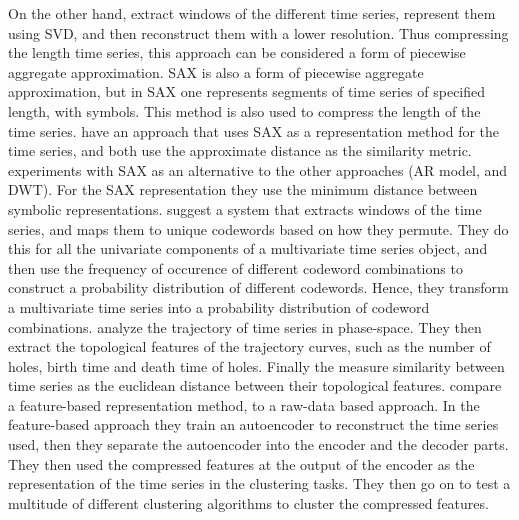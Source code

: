 On the other hand, \textcite{svd_birch_tsc_stock_price} extract windows of the different time series, represent them using SVD, and then reconstruct them with a lower resolution.
Thus compressing the length time series, this approach can be considered a form of piecewise aggregate approximation. 
SAX is also a form of piecewise aggregate approximation, but in SAX one represents segments of time series of specified length, with symbols.
This method is also used to compress the length of the time series. 
\textcite{clust_large_datasets_aghabozorg, apxdist_sax_k_modes} have an approach that uses SAX as a representation method for the time series, and both use the approximate distance as the similarity metric.
\textcite{shape_feat_mod_tsc_rfa} experiments with SAX as an alternative to the other approaches (AR model, and DWT). For the SAX representation they use the minimum distance between symbolic representations.
\textcite{dependency_tsc_energy_markets} suggest a system that extracts windows of the time series, and maps them to unique codewords based on how they permute.
They do this for all the univariate components of a multivariate time series object, 
and then use the frequency of occurence of different codeword combinations to construct a probability distribution of different codewords. 
Hence, they transform a multivariate time series into a probability distribution of codeword combinations. 
\textcite{topology_for_shape_based_tsc} analyze the trajectory of time series in phase-space. 
They then extract the topological features of the trajectory curves, such as the number of holes, birth time and death time of holes. 
Finally the measure similarity between time series as the euclidean distance between their topological features.
\textcite{auto_encoder_many_tsc_algorithms} compare a feature-based representation method, to a raw-data based approach. 
In the feature-based approach they train an autoencoder to reconstruct the time series used, then they separate the autoencoder into the encoder and the decoder parts. 
They then used the compressed features at the output of the encoder as the representation of the time series in the clustering tasks. 
They then go on to test a multitude of different clustering algorithms to cluster the compressed features. \bigskip

